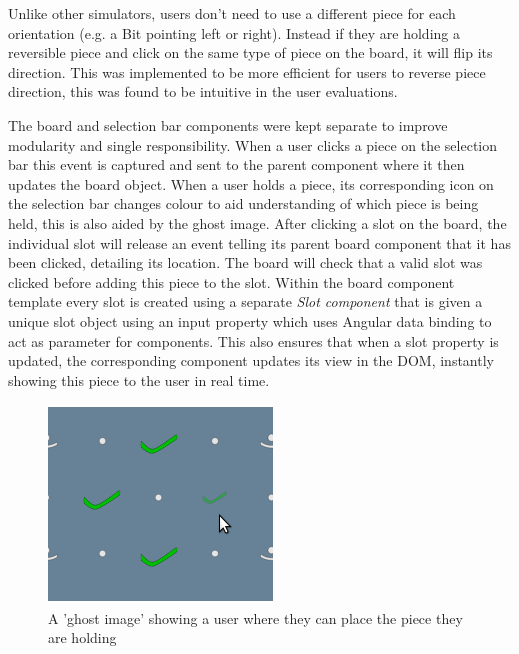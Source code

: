\documentclass{l4proj}
\begin{document}
Unlike other simulators, users don't need to use a different piece for each orientation (e.g. a Bit pointing left or right). Instead if they are holding a reversible piece and click on the same type of piece on the board, it will flip its direction. This was implemented to be more efficient for users to reverse piece direction, this was found to be intuitive in the user evaluations. 

The board and selection bar components were kept separate to improve modularity and single responsibility. When a user clicks a piece on the selection bar this event is captured and sent to the parent component where it then updates the board object. When a user holds a piece, its corresponding icon on the selection bar changes colour to aid understanding of which piece is being held, this is also aided by the ghost image. After clicking a slot on the board, the individual slot will release an event telling its parent board component that it has been clicked, detailing its location. The board will check that a valid slot was clicked before adding this piece to the slot. Within the board component template every slot is created using a separate \emph{Slot component} that is given a unique slot object using an input property which uses Angular data binding to act as parameter for components. This also ensures that when a slot property is updated, the corresponding component updates its view in the DOM, instantly showing this piece to the user in real time.



\begin{figure}
    \centering
    \includegraphics[width=0.4\linewidth]{images/ghostImage.png}
    \caption{A 'ghost image' showing a user where they can place the piece they are holding}
    \label{fig:ghostPiece}
\end{figure}
\end{document}

